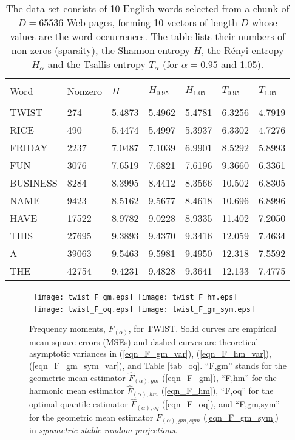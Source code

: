 \documentclass{sig-alternate}
\begin{document}
\begin{table}[h]
\caption{\small  The data set consists of 10 English words selected from a chunk of $D=65536$ Web pages, forming 10 vectors of length $D$ whose values are the word occurrences. The table lists their numbers of non-zeros (sparsity), the Shannon entropy $H$, the R\'enyi entropy $H_\alpha$ and the Tsallis entropy $T_\alpha$ (for $\alpha = 0.95$ and 1.05).
 }
\begin{center}{\scriptsize\tiny
\begin{tabular}{l l l l l l l}
\hline \hline\\
Word &Nonzero  & $H$ &$H_{0.95}$  &$H_{1.05}$   &$T_{0.95}$  &$T_{1.05}$ \\  \\\hline
TWIST &274 &5.4873 &5.4962 &5.4781 &6.3256 &4.7919\\
RICE &490 &5.4474 &5.4997 &5.3937 &6.3302 &4.7276\\
FRIDAY &2237 &7.0487 &7.1039 &6.9901 &8.5292 &5.8993 \\
FUN &3076 & 7.6519   & 7.6821 &    7.6196  &   9.3660  &   6.3361\\
BUSINESS &8284 &8.3995 &8.4412 &8.3566 &10.502 &6.8305\\
NAME & 9423 &8.5162 &9.5677 &8.4618 &10.696 &6.8996\\
HAVE & 17522  &8.9782 &9.0228 & 8.9335 & 11.402 & 7.2050\\
THIS & 27695  &9.3893 &9.4370 &9.3416 &12.059 &7.4634 \\
A    & 39063  &9.5463  &9.5981  &9.4950  &12.318   &7.5592\\
THE  & 42754  & 9.4231 &9.4828  &9.3641  &12.133  &7.4775\\
\hline\hline
\end{tabular}
}
\end{center}
\label{tab_data}
\end{table}
\begin{figure}[h]
\begin{center}\mbox{
{\texttt{[image: twist\_F\_gm.eps]}} \hspace{-0.1in}
{\texttt{[image: twist\_F\_hm.eps]}}}\\\mbox{
{\texttt{[image: twist\_F\_oq.eps]}} \hspace{-0.1in}
{\texttt{[image: twist\_F\_gm\_sym.eps]}}
}
\end{center}
\vspace{-0.15in}
\caption{Frequency moments, $F_{(\alpha)}$, for TWIST.  Solid curves are   empirical mean square errors (MSEs) and dashed curves are theoretical asymptotic variances in (\ref{eqn_F_gm_var}), (\ref{eqn_F_hm_var}), (\ref{eqn_F_gm_sym_var}), and Table \ref{tab_oq}.  ``F,gm'' stands for the geometric mean estimator $\hat{F}_{(\alpha),gm}$  (\ref{eqn_F_gm}), ``F,hm'' for the harmonic mean estimator $\hat{F}_{(\alpha),hm}$   (\ref{eqn_F_hm}), ``F,oq'' for the optimal quantile estimator $\hat{F}_{(\alpha),oq}$ (\ref{eqn_F_oq}), and ``F,gm,sym'' for the geometric mean estimator $F_{(\alpha),gm,sym}$ (\ref{eqn_F_gm_sym}) in {\em symmetric stable random projections}. }\label{fig_twist_F}
\end{figure}
\end{document}
